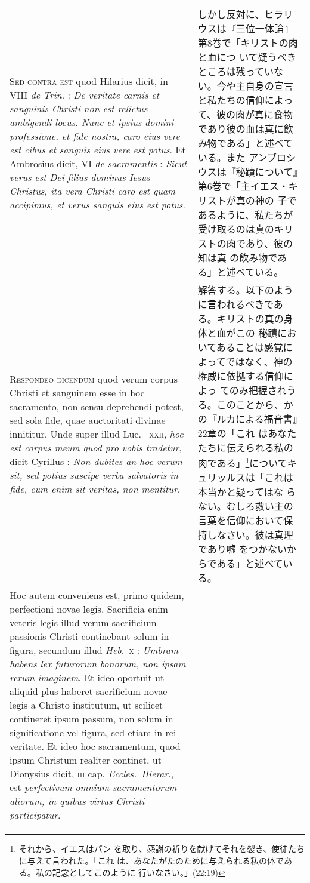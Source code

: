 \documentclass[10pt]{jsarticle} %
\begin{document}
\begin{longtable}{p{21em}p{21em}}
\\




{\scshape Sed contra est} quod Hilarius dicit, in VIII {\itshape de
Trin}. : {\itshape De veritate carnis et sanguinis Christi non est
relictus ambigendi locus. Nunc et ipsius domini professione, et fide
nostra, caro eius vere est cibus et sanguis eius vere est potus}. Et
Ambrosius dicit, VI {\itshape de sacramentis} : {\itshape Sicut verus
est Dei filius dominus Iesus Christus, ita vera Christi caro est quam
accipimus, et verus sanguis eius est potus}.

&

しかし反対に、ヒラリウスは『三位一体論』第8巻で「キリストの肉と血につ
いて疑うべきところは残っていない。今や主自身の宣言と私たちの信仰によっ
て、彼の肉が真に食物であり彼の血は真に飲み物である」と述べている。また
アンブロシウスは『秘蹟について』第6巻で「主イエス・キリストが真の神の
子であるように、私たちが受け取るのは真のキリストの肉であり、彼の知は真
の飲み物である」と述べている。


\\




{\scshape Respondeo dicendum} quod verum corpus Christi et sanguinem
esse in hoc sacramento, non sensu deprehendi potest, sed sola fide,
quae auctoritati divinae innititur. Unde super illud Luc.~{\scshape
xxii}, {\itshape hoc est corpus meum quod pro vobis tradetur}, dicit
Cyrillus : {\itshape Non dubites an hoc verum sit, sed potius suscipe
verba salvatoris in fide, cum enim sit veritas, non mentitur}.


&

解答する。以下のように言われるべきである。キリストの真の身体と血がこの
秘蹟においてあることは感覚によってではなく、神の権威に依拠する信仰によっ
てのみ把握されうる。このことから、かの『ルカによる福音書』22章の「これ
はあなたたちに伝えられる私の肉である」\footnote{それから、イエスはパン
を取り、感謝の祈りを献げてそれを裂き、使徒たちに与えて言われた。「これ
は、あなたがたのために与えられる私の体である。私の記念としてこのように
行いなさい。」(22:19)}についてキュリッルスは「これは本当かと疑ってはな
らない。むしろ救い主の言葉を信仰において保持しなさい。彼は真理であり嘘
をつかないからである」と述べている。


\\


Hoc autem conveniens est, primo quidem, perfectioni novae
legis. Sacrificia enim veteris legis illud verum sacrificium passionis
Christi continebant solum in figura, secundum illud {\itshape
Heb}.~{\scshape x} : {\itshape Umbram habens lex futurorum bonorum,
non ipsam rerum imaginem}. Et ideo oportuit ut aliquid plus haberet
sacrificium novae legis a Christo institutum, ut scilicet contineret
ipsum passum, non solum in significatione vel figura, sed etiam in rei
veritate. Et ideo hoc sacramentum, quod ipsum Christum realiter
continet, ut Dionysius dicit, {\scshape iii} cap. {\itshape
Eccles.~Hierar}., est {\itshape perfectivum omnium sacramentorum
aliorum, in quibus virtus Christi participatur}.



\end{longtable}
\end{document}
